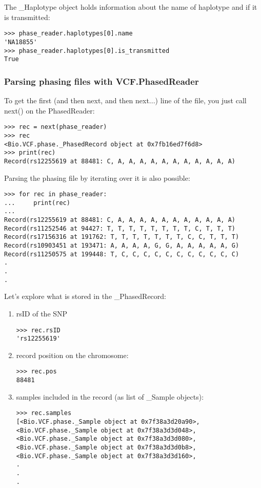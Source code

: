 \noindent The \_Haplotype object holds information about the name of haplotype and if it is transmitted:

\begin{verbatim}
>>> phase_reader.haplotypes[0].name
'NA18855'
>>> phase_reader.haplotypes[0].is_transmitted
True

\end{verbatim}

\subsubsection{Parsing phasing files with VCF.PhasedReader}

\noindent To get the first (and then next, and then next...) line of the file, you just call next() on the PhasedReader:

\begin{verbatim}
>>> rec = next(phase_reader)
>>> rec
<Bio.VCF.phase._PhasedRecord object at 0x7fb16ed7f6d8>
>>> print(rec)
Record(rs12255619 at 88481: C, A, A, A, A, A, A, A, A, A, A, A)

\end{verbatim}

\noindent Parsing the phasing file by iterating over it is also possible:

\begin{verbatim}
>>> for rec in phase_reader:
...     print(rec)
...
Record(rs12255619 at 88481: C, A, A, A, A, A, A, A, A, A, A, A)
Record(rs11252546 at 94427: T, T, T, T, T, T, T, T, C, T, T, T)
Record(rs17156316 at 191762: T, T, T, T, T, T, T, C, C, T, T, T)
Record(rs10903451 at 193471: A, A, A, A, G, G, A, A, A, A, A, G)
Record(rs11250575 at 199448: T, C, C, C, C, C, C, C, C, C, C, C)
.
.
.

\end{verbatim}

\noindent Let's explore what is stored in the \_PhasedRecord:
\begin{enumerate}
\item rsID of the SNP
\begin{verbatim}
>>> rec.rsID
'rs12255619'
\end{verbatim}

\item record position on the chromosome:
\begin{verbatim}
>>> rec.pos
88481
\end{verbatim}

\item samples included in the record (as list of \_Sample objects):
\begin{verbatim}
>>> rec.samples
[<Bio.VCF.phase._Sample object at 0x7f38a3d20a90>,
<Bio.VCF.phase._Sample object at 0x7f38a3d3d048>,
<Bio.VCF.phase._Sample object at 0x7f38a3d3d080>,
<Bio.VCF.phase._Sample object at 0x7f38a3d3d0b8>,
<Bio.VCF.phase._Sample object at 0x7f38a3d3d160>,
.
.
.
\end{verbatim}
\end{enumerate}

